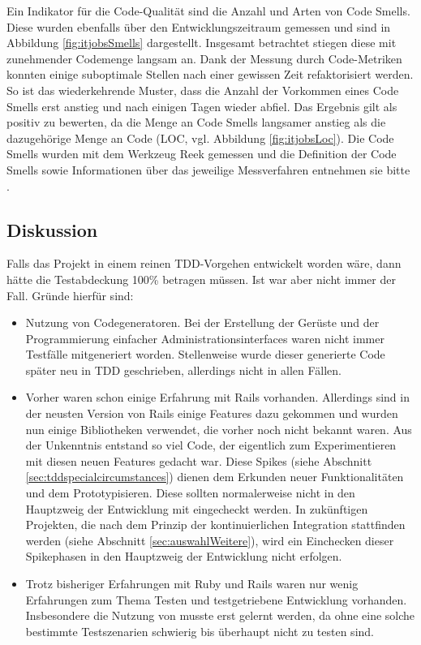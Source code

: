 Ein Indikator für die Code-Qualität sind die Anzahl und Arten von Code Smells. Diese wurden ebenfalls über den Entwicklungszeitraum gemessen und sind in Abbildung \ref{fig:itjobsSmells} dargestellt. Insgesamt betrachtet stiegen diese mit zunehmender Codemenge langsam an. Dank der Messung durch Code-Metriken konnten einige suboptimale Stellen nach einer gewissen Zeit refaktorisiert werden. So ist das wiederkehrende Muster, dass die Anzahl der Vorkommen eines Code Smells erst anstieg und nach einigen Tagen wieder abfiel. Das Ergebnis gilt als positiv zu bewerten, da die Menge an Code Smells langsamer anstieg als die dazugehörige Menge an Code (LOC, vgl. Abbildung \ref{fig:itjobsLoc}). Die Code Smells wurden mit dem Werkzeug Reek gemessen und die Definition der Code Smells sowie Informationen über das jeweilige Messverfahren entnehmen sie bitte \citep{kevin_rutherford_code_2010}.

\subsection*{Diskussion}
Falls das Projekt in einem reinen TDD-Vorgehen entwickelt worden wäre, dann hätte die Testabdeckung 100\% betragen müssen. Ist war aber nicht immer der Fall. Gründe hierfür sind:
\begin{itemize}
 \item Nutzung von Codegeneratoren. Bei der Erstellung der Gerüste und der Programmierung einfacher Administrationsinterfaces waren nicht immer Testfälle mitgeneriert worden. Stellenweise wurde dieser generierte Code später neu in TDD geschrieben, allerdings nicht in allen Fällen.
 \item Vorher waren schon einige Erfahrung mit Rails vorhanden. Allerdings sind in der neusten Version von Rails einige Features dazu gekommen und wurden nun einige Bibliotheken verwendet, die vorher noch nicht bekannt waren. Aus der Unkenntnis entstand so viel Code, der eigentlich zum Experimentieren mit diesen neuen Features gedacht war. Diese Spikes (siehe Abschnitt \ref{sec:tddspecialcircumstances}) dienen dem Erkunden neuer Funktionalitäten und dem Prototypisieren. Diese sollten normalerweise nicht in den Hauptzweig der Entwicklung mit eingecheckt werden. In zukünftigen Projekten, die nach dem Prinzip der kontinuierlichen Integration stattfinden werden (siehe Abschnitt \ref{sec:auswahlWeitere}), wird ein Einchecken dieser Spikephasen in den Hauptzweig der Entwicklung nicht erfolgen.
 \item Trotz bisheriger Erfahrungen mit Ruby und Rails waren nur wenig Erfahrungen zum Thema Testen und testgetriebene Entwicklung vorhanden. Insbesondere die Nutzung von  musste erst gelernt werden, da ohne eine solche bestimmte Testszenarien schwierig bis überhaupt nicht zu testen sind.
\end{itemize}

